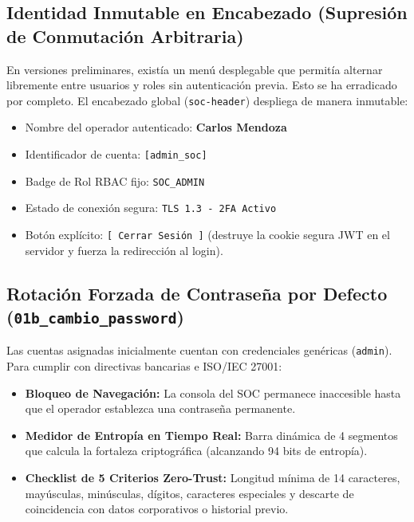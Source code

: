 \documentclass[11pt,a4paper]{article}
\begin{document}
\subsection{Identidad Inmutable en Encabezado (Supresión de Conmutación Arbitraria)}
En versiones preliminares, existía un menú desplegable que permitía alternar libremente entre usuarios y roles sin autenticación previa. Esto se ha erradicado por completo. El encabezado global (\texttt{soc-header}) despliega de manera inmutable:
\begin{itemize}[itemsep=2bp]
    \item Nombre del operador autenticado: \textbf{Carlos Mendoza}
    \item Identificador de cuenta: \texttt{[admin\_soc]}
    \item Badge de Rol RBAC fijo: \texttt{SOC\_ADMIN}
    \item Estado de conexión segura: \texttt{TLS 1.3 - 2FA Activo}
    \item Botón explícito: \texttt{[ Cerrar Sesión ]} (destruye la cookie segura JWT en el servidor y fuerza la redirección al login).
\end{itemize}

\subsection{Rotación Forzada de Contraseña por Defecto (\texttt{01b\_cambio\_password})}
Las cuentas asignadas inicialmente cuentan con credenciales genéricas (\texttt{admin}). Para cumplir con directivas bancarias e ISO/IEC 27001:
\begin{itemize}[itemsep=2bp]
    \item \textbf{Bloqueo de Navegación:} La consola del SOC permanece inaccesible hasta que el operador establezca una contraseña permanente.
    \item \textbf{Medidor de Entropía en Tiempo Real:} Barra dinámica de 4 segmentos que calcula la fortaleza criptográfica (alcanzando 94 bits de entropía).
    \item \textbf{Checklist de 5 Criterios Zero-Trust:} Longitud mínima de 14 caracteres, mayúsculas, minúsculas, dígitos, caracteres especiales y descarte de coincidencia con datos corporativos o historial previo.
\end{itemize}
\end{document}
